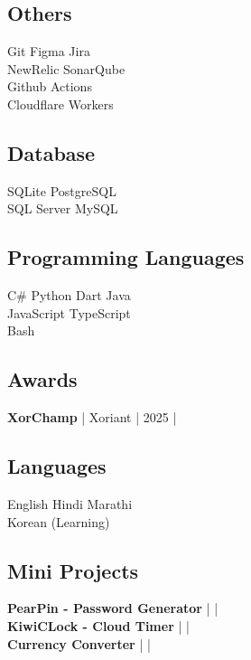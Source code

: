 \documentclass[]{deedy-resume-reversed}
\begin{document}
\begin{minipage}[t]{0.33\textwidth}
\subsection{Others}
Git \textbullet Figma \textbullet Jira \\
NewRelic \textbullet SonarQube \\
Github Actions \\
Cloudflare Workers \\
\sectionsep

\subsection{Database}
SQLite \textbullet PostgreSQL \\
SQL Server \textbullet MySQL \\
\sectionsep

\subsection{Programming Languages}
C\# \textbullet{} Python \textbullet{} Dart \textbullet{} Java \\
JavaScript \textbullet{} TypeScript \\
Bash
\sectionsep

\subsection{Awards}
\textbf{XorChamp} | Xoriant | 2025  | 
\href{https://github.com/sunnydodti/resume/blob/main/awards/XorChamp%20-%20Sunny%20Dodti.pdf}{\faExternalLink } 
\sectionsep

\subsection{Languages}
English \textbullet{} Hindi \textbullet{} Marathi \\
Korean (Learning) 
\sectionsep

\subsection{Mini Projects}
\textbf{PearPin - Password Generator} | \href{https://github.com/sunnydodti/pearpin}{\faGithub} | \href{https://pearpin.persist.site}{\faExternalLink} \\
\textbf{KiwiCLock - Cloud Timer} | \href{https://github.com/sunnydodti/kiwiclock}{\faGithub} | \href{https://kiwiclock.persist.site}{\faExternalLink} \\
\textbf{Currency Converter} | \href{https://github.com/sunnydodti/currency_converter}{\faGithub} | \href{https://sunnydodti.github.io/currency_converter}{\faExternalLink}
\sectionsep

\end{minipage}
\end{document}
